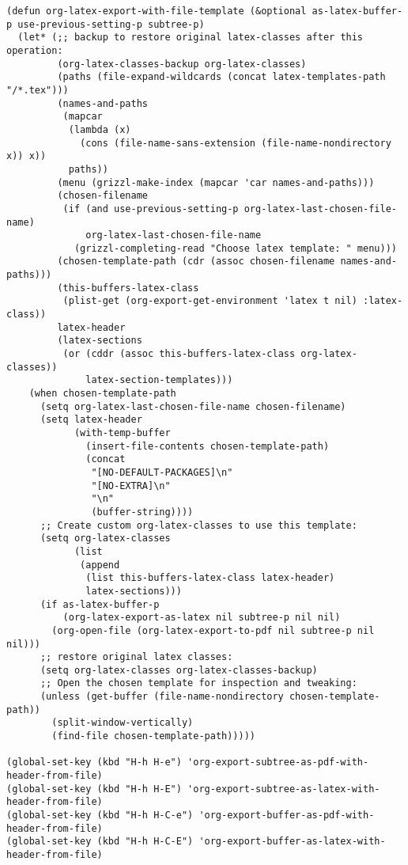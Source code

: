 \documentclass[10pt]{article}
\begin{document}
\begin{verbatim}
(defun org-latex-export-with-file-template (&optional as-latex-buffer-p use-previous-setting-p subtree-p)
  (let* (;; backup to restore original latex-classes after this operation:
         (org-latex-classes-backup org-latex-classes)
         (paths (file-expand-wildcards (concat latex-templates-path "/*.tex")))
         (names-and-paths
          (mapcar
           (lambda (x)
             (cons (file-name-sans-extension (file-name-nondirectory x)) x))
           paths))
         (menu (grizzl-make-index (mapcar 'car names-and-paths)))
         (chosen-filename
          (if (and use-previous-setting-p org-latex-last-chosen-file-name)
              org-latex-last-chosen-file-name
            (grizzl-completing-read "Choose latex template: " menu)))
         (chosen-template-path (cdr (assoc chosen-filename names-and-paths)))
         (this-buffers-latex-class
          (plist-get (org-export-get-environment 'latex t nil) :latex-class))
         latex-header
         (latex-sections
          (or (cddr (assoc this-buffers-latex-class org-latex-classes))
              latex-section-templates)))
    (when chosen-template-path
      (setq org-latex-last-chosen-file-name chosen-filename)
      (setq latex-header
            (with-temp-buffer
              (insert-file-contents chosen-template-path)
              (concat
               "[NO-DEFAULT-PACKAGES]\n"
               "[NO-EXTRA]\n"
               "\n"
               (buffer-string))))
      ;; Create custom org-latex-classes to use this template:
      (setq org-latex-classes
            (list
             (append
              (list this-buffers-latex-class latex-header)
              latex-sections)))
      (if as-latex-buffer-p
          (org-latex-export-as-latex nil subtree-p nil nil)
        (org-open-file (org-latex-export-to-pdf nil subtree-p nil nil)))
      ;; restore original latex classes:
      (setq org-latex-classes org-latex-classes-backup)
      ;; Open the chosen template for inspection and tweaking:
      (unless (get-buffer (file-name-nondirectory chosen-template-path))
        (split-window-vertically)
        (find-file chosen-template-path)))))

(global-set-key (kbd "H-h H-e") 'org-export-subtree-as-pdf-with-header-from-file)
(global-set-key (kbd "H-h H-E") 'org-export-subtree-as-latex-with-header-from-file)
(global-set-key (kbd "H-h H-C-e") 'org-export-buffer-as-pdf-with-header-from-file)
(global-set-key (kbd "H-h H-C-E") 'org-export-buffer-as-latex-with-header-from-file)
\end{verbatim}
\end{document}
